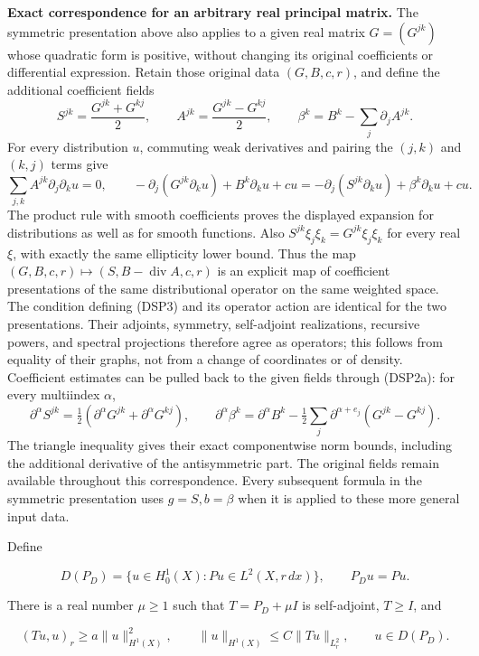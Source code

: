 \documentclass[
  11pt,
]{article}
\begin{document}
\textbf{Exact correspondence for an arbitrary real principal matrix.}
The symmetric presentation above also applies to a given real matrix
\(G=(G^{jk})\) whose quadratic form is positive, without changing its
original coefficients or differential expression. Retain those original
data \((G,B,c,r)\), and define the additional coefficient fields \[
 S^{jk}=\frac{G^{jk}+G^{kj}}2,\qquad
 A^{jk}=\frac{G^{jk}-G^{kj}}2,\qquad
 \beta^k=B^k-\sum_j\partial_j A^{jk}.
 \tag{DSP2a}
\] For every distribution \(u\), commuting weak derivatives and pairing
the \((j,k)\) and \((k,j)\) terms give \[
 \sum_{j,k}A^{jk}\partial_j\partial_k u=0,\qquad
 -\partial_j(G^{jk}\partial_k u)+B^k\partial_k u+cu
 =-\partial_j(S^{jk}\partial_k u)+\beta^k\partial_k u+cu.
 \tag{DSP2b}
\] The product rule with smooth coefficients proves the displayed
expansion for distributions as well as for smooth functions. Also
\(S^{jk}\xi_j\xi_k=G^{jk}\xi_j\xi_k\) for every real \(\xi\), with
exactly the same ellipticity lower bound. Thus the map
\((G,B,c,r)\mapsto(S,B-\operatorname{div}A,c,r)\) is an explicit map of
coefficient presentations of the same distributional operator on the
same weighted space. The condition defining (DSP3) and its operator
action are identical for the two presentations. Their adjoints,
symmetry, self-adjoint realizations, recursive powers, and spectral
projections therefore agree as operators; this follows from equality of
their graphs, not from a change of coordinates or of density.
Coefficient estimates can be pulled back to the given fields through
(DSP2a): for every multiindex \(\alpha\), \[
 \partial^\alpha S^{jk}=\tfrac12(\partial^\alpha G^{jk}
                              +\partial^\alpha G^{kj}),\qquad
 \partial^\alpha\beta^k=\partial^\alpha B^k
 -\tfrac12\sum_j\partial^{\alpha+e_j}(G^{jk}-G^{kj}).
 \tag{DSP2c}
\] The triangle inequality gives their exact componentwise norm bounds,
including the additional derivative of the antisymmetric part. The
original fields remain available throughout this correspondence. Every
subsequent formula in the symmetric presentation uses \(g=S,b=\beta\)
when it is applied to these more general input data.

Define

\[
 D(P_D)=\{u\in H_0^1(X):Pu\in L^2(X,r\,dx)\},\qquad P_Du=Pu.
 \tag{DSP3}
\]

There is a real number \(\mu\geq1\) such that \(T=P_D+\mu I\) is
self-adjoint, \(T\geq I\), and

\[
 (Tu,u)_r\geq a\|u\|_{H^1(X)}^2,\qquad
 \|u\|_{H^1(X)}\leq C\|Tu\|_{L^2_r},\qquad u\in D(P_D).
 \tag{DSP4}
\]
\end{document}
